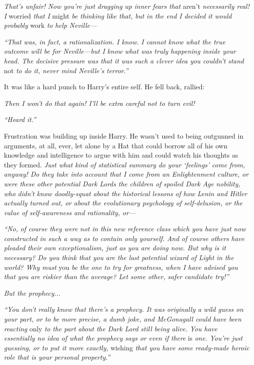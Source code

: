 \emph{That’s unfair! Now you’re just dragging up inner fears that} aren’t \emph{necessarily real! I} worried \emph{that I} might \emph{be thinking like that, but in the end I decided it would probably} work \emph{to help Neville—}

\emph{“That was, in fact, a rationalization. I know. I cannot know what the true outcome will be for Neville—but I know what was truly happening inside your head. The decisive pressure was that it was such a clever idea you couldn’t stand} not \emph{to do it, never mind Neville’s terror.”}

It was like a hard punch to Harry’s entire self. He fell back, rallied:

\emph{Then I won’t do that again! I’ll be extra careful not to turn evil!}

\emph{“Heard it.”}

Frustration was building up inside Harry. He wasn’t used to being outgunned in arguments, at all, ever, let alone by a Hat that could borrow all of his own knowledge and intelligence to argue with him and could watch his thoughts as they formed. \emph{Just what kind of statistical summary do your ‘feelings’ come from, anyway! Do they take into account that I come from an Enlightenment culture, or were these other potential Dark Lords the children of spoiled Dark Age nobility, who didn’t know doodly-squat about the historical lessons of how Lenin and Hitler actually turned out, or about the evolutionary psychology of self-delusion, or the value of self-awareness and rationality, or—}

\emph{“No, of course they were not in this new reference class which you have just now constructed in such a way as to contain only yourself. And of course others have pleaded their own exceptionalism, just as you are doing now. But why is it necessary? Do you think that you are the last potential wizard of Light in the world? Why must} you \emph{be the one to try for greatness, when I have advised you that you are riskier than the average? Let some other, safer candidate try!”}

\emph{But the prophecy...}

\emph{“You don’t really know that there’s a prophecy. It was originally a wild guess on your part, or to be more precise, a dumb joke, and McGonagall could have been reacting} only \emph{to the part about the Dark Lord still being alive. You have essentially no idea of what the prophecy says or even if there} is \emph{one. You’re just guessing, or to put it more exactly,} wishing \emph{that you have some ready-made heroic role that is your personal property.”}

